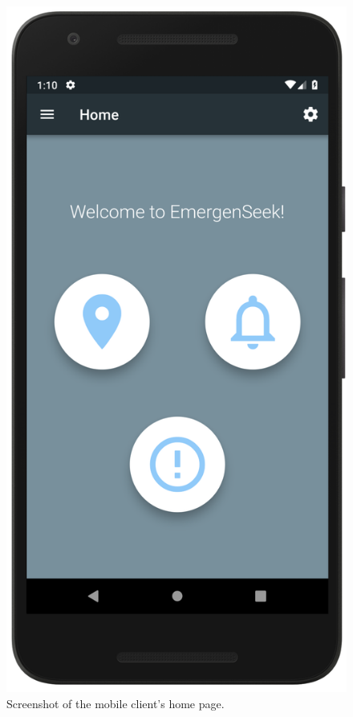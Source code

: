 \documentclass[10pt, a4paper]{article}
\begin{document}
\begin{figure}[!htb]
  \includegraphics[width=\linewidth]{demo_home.png}
  \caption{Screenshot of the mobile client's home page.}\label{fig:mobile1}
\endminipage\hfill

\end{figure}
\end{document}
